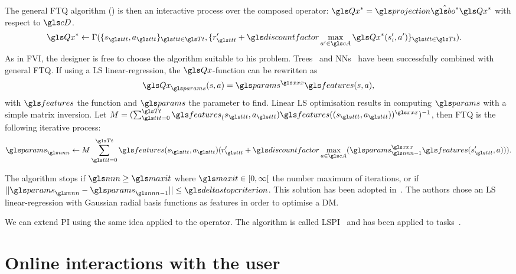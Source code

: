 The general \gls{FTQ} algorithm () is then an interactive process over the composed operator: $\Q^* = \projection\hat{\bo^{*}} \Q^*$ with respect to $\cD$.
\begin{align}
    &\Q^* \leftarrow \Gamma(\{s_{\indextransition},a_{\indextransition}\}_{{\indextransition}\in \T},\{r'_{\indextransition} + \discountfactor  \max_{a'\in\cA} \Q^*(s'_i,a')\}_{{\indextransition} \in \T}).
    \label{eq:fitted-q}
\end{align}
As in \gls{FVI}, the designer is free to choose the  algorithm suitable to his problem. Trees~\parencite{Ernst05} and \glspl{NN}~\parencite{Riedmiller05} have been successfully combined with general \gls{FTQ}. If using a \gls{LS} linear-regression, the $\Q$-function can be rewritten as
\begin{equation}
    \Q_{ \params}(s,a)=  \params^{\transpose}\features(s,a),
\end{equation}
with $\features$  the  function and $\params$ the parameter to find. Linear \gls{LS} optimisation results in computing $\params$ with a simple matrix inversion. Let $M = (\sum_{{\indextransition}=0}^{\T}\features_(s_{\indextransition},a_{\indextransition})\features((s_{\indextransition},a_{\indextransition}))^{\transpose})^{-1}$, then \gls{FTQ} is the following iterative process:
\begin{equation}
    \params_{\n} \leftarrow M \sum_{\indextransition=0}^{\T} \features(s_{\indextransition},a_{\indextransition})(r_{\indextransition}'+\discountfactor\max_{a\in \cA}( \params_{\n-1}^{\transpose} \features(s_{\indextransition}',a))).
\end{equation}

The algorithm stops if $\n \geq \maxiteration$ where $\maxiteration \in [0,\infty[$ the number maximum of iterations, or if $||\params_{\n}-\params_{\n-1}|| \leq \deltastoppingcriterion$.
This solution has been adopted in~\parencite{pietquin2011sample}. The authors chose an \gls{LS} linear-regression with Gaussian radial basis functions as features in order to optimise a \gls{DM}.

We can extend \gls{PI} using the same idea applied to the  operator. The algorithm is called \gls{LSPI}~\parencite{Lagoudakis03} and has been applied to  tasks~\parencite{li2009reinforcement,barlier18}.

%

\section{Online interactions with the user}

